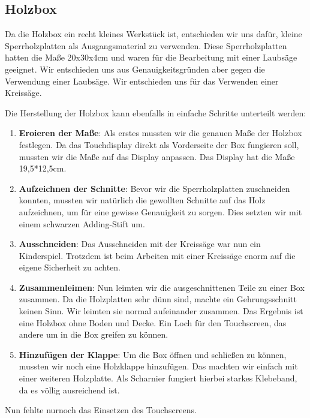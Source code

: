 \subsection{Holzbox}
Da die Holzbox ein recht kleines Werkstück ist, entschieden wir uns dafür, kleine Sperrholzplatten als Ausgangsmaterial zu verwenden.
Diese Sperrholzplatten hatten die Maße 20x30x4cm und waren für die Bearbeitung mit einer Laubsäge geeignet. Wir entschieden uns aus
Genauigkeitsgründen aber gegen die Verwendung einer Laubsäge. Wir entschieden uns für das Verwenden einer Kreissäge.

Die Herstellung der Holzbox kann ebenfalls in einfache Schritte unterteilt werden:
\begin{enumerate}
    \item \textbf{Eroieren der Maße}: Als erstes mussten wir die genauen Maße der Holzbox festlegen. Da das Touchdisplay direkt als
    Vorderseite der Box fungieren soll, mussten wir die Maße auf das Display anpassen. Das Display hat die Maße 19,5*12,5cm.
    \item \textbf{Aufzeichnen der Schnitte}: Bevor wir die Sperrholzplatten zuschneiden konnten, mussten wir natürlich die gewollten
    Schnitte auf das Holz aufzeichnen, um für eine gewisse Genauigkeit zu sorgen. Dies setzten wir mit einem schwarzen Adding-Stift um.
    \item \textbf{Ausschneiden}: Das Ausschneiden mit der Kreissäge war nun ein Kinderspiel. Trotzdem ist beim Arbeiten mit einer Kreissäge
    enorm auf die eigene Sicherheit zu achten.
    \item \textbf{Zusammenleimen}: Nun leimten wir die ausgeschnittenen Teile zu einer Box zusammen. Da die Holzplatten sehr dünn sind,
    machte ein Gehrungsschnitt keinen Sinn. Wir leimten sie normal aufeinander zusammen. Das Ergebnis ist eine Holzbox ohne Boden und Decke.
    Ein Loch für den Touchscreen, das andere um in die Box greifen zu können.
    \item \textbf{Hinzufügen der Klappe}: Um die Box öffnen und schließen zu können, mussten wir noch eine Holzklappe hinzufügen. Das machten
    wir einfach mit einer weiteren Holzplatte. Als Scharnier fungiert hierbei starkes Klebeband, da es völlig ausreichend ist.
\end{enumerate}

Nun fehlte nurnoch das Einsetzen des Touchscreens.